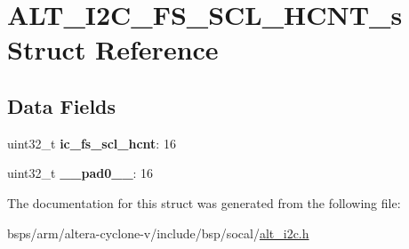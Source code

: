 \hypertarget{structALT__I2C__FS__SCL__HCNT__s}{}\section{A\+L\+T\+\_\+\+I2\+C\+\_\+\+F\+S\+\_\+\+S\+C\+L\+\_\+\+H\+C\+N\+T\+\_\+s Struct Reference}
\label{structALT__I2C__FS__SCL__HCNT__s}
\subsection*{Data Fields}
\begin{DoxyCompactItemize}
\item 
\mbox{\label{structALT__I2C__FS__SCL__HCNT__s_a0ddf1ab8cde6b6001c5b6d735b50aab8}} 
uint32\+\_\+t {\bfseries ic\+\_\+fs\+\_\+scl\+\_\+hcnt}\+: 16
\item 
\mbox{\label{structALT__I2C__FS__SCL__HCNT__s_ac03a7e2b3a0f8818ccbb638167ad745c}} 
uint32\+\_\+t {\bfseries \+\_\+\+\_\+pad0\+\_\+\+\_\+}\+: 16
\end{DoxyCompactItemize}


The documentation for this struct was generated from the following file\+:\begin{DoxyCompactItemize}
\item 
bsps/arm/altera-\/cyclone-\/v/include/bsp/socal/\mbox{\hyperlink{socal_2alt__i2c_8h}{alt\+\_\+i2c.\+h}}\end{DoxyCompactItemize}
